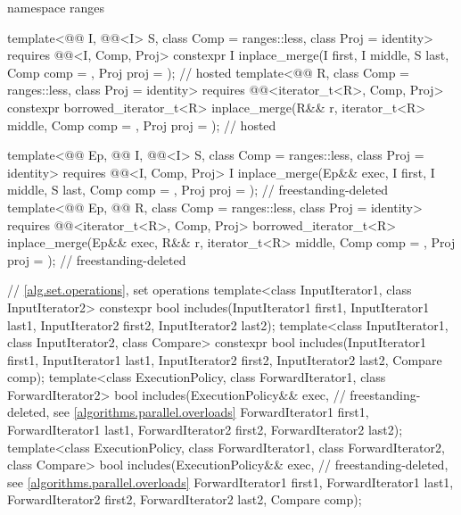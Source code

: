 \begin{codeblock}
{  namespace ranges {
    template<@@ I, @@<I> S, class Comp = ranges::less,
             class Proj = identity>
      requires @@<I, Comp, Proj>
      constexpr I
        inplace_merge(I first, I middle, S last, Comp comp = {}, Proj proj = {});       // hosted
    template<@@ R, class Comp = ranges::less, class Proj = identity>
      requires @@<iterator_t<R>, Comp, Proj>
      constexpr borrowed_iterator_t<R>
        inplace_merge(R&& r, iterator_t<R> middle, Comp comp = {}, Proj proj = {});     // hosted

    template<@@ Ep, @@ I, @@<I> S,
             class Comp = ranges::less, class Proj = identity>
      requires @@<I, Comp, Proj>
      I inplace_merge(Ep&& exec, I first, I middle, S last, Comp comp = {},
                      Proj proj = {});                          // freestanding-deleted
    template<@@ Ep, @@ R, class Comp = ranges::less,
             class Proj = identity>
      requires @@<iterator_t<R>, Comp, Proj>
      borrowed_iterator_t<R>
        inplace_merge(Ep&& exec, R&& r, iterator_t<R> middle, Comp comp = {},
                      Proj proj = {});                          // freestanding-deleted
  }

  // \ref{alg.set.operations}, set operations
  template<class InputIterator1, class InputIterator2>
    constexpr bool includes(InputIterator1 first1, InputIterator1 last1,
                            InputIterator2 first2, InputIterator2 last2);
  template<class InputIterator1, class InputIterator2, class Compare>
    constexpr bool includes(InputIterator1 first1, InputIterator1 last1,
                            InputIterator2 first2, InputIterator2 last2,
                            Compare comp);
  template<class ExecutionPolicy, class ForwardIterator1, class ForwardIterator2>
    bool includes(ExecutionPolicy&& exec,                       // freestanding-deleted, see \ref{algorithms.parallel.overloads}
                  ForwardIterator1 first1, ForwardIterator1 last1,
                  ForwardIterator2 first2, ForwardIterator2 last2);
  template<class ExecutionPolicy, class ForwardIterator1, class ForwardIterator2,
           class Compare>
    bool includes(ExecutionPolicy&& exec,                       // freestanding-deleted, see \ref{algorithms.parallel.overloads}
                  ForwardIterator1 first1, ForwardIterator1 last1,
                  ForwardIterator2 first2, ForwardIterator2 last2,
                  Compare comp);

}
\end{codeblock}
